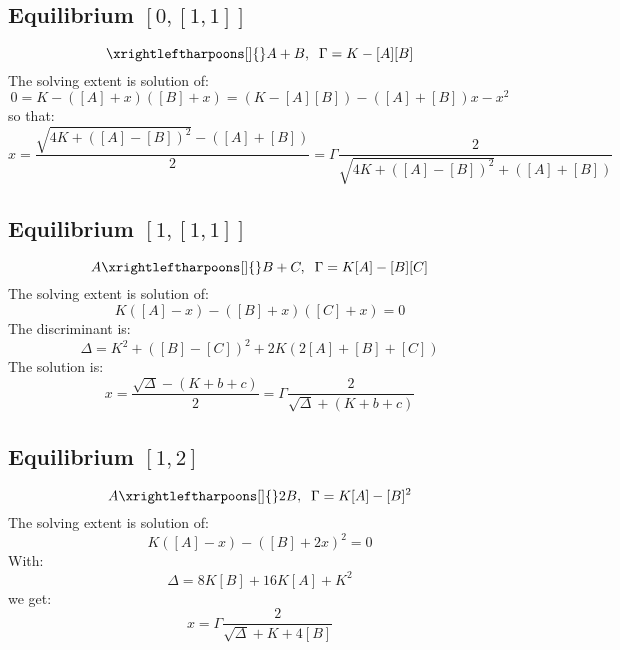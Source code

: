 \documentclass[aps,12pt]{revtex4}
\begin{document}
\subsection{Equilibrium $[0,[1,1]]$}
\begin{equation}
	\xrightleftharpoons[]{} A+B, \;\; \Gamma = K - [A][B]
\end{equation}
The solving extent is solution of:
\begin{equation}
	0 = K - ([A]+x)([B]+x) = (K - [A][B]) - ([A]+[B]) x - x^2
\end{equation}
so that:
\begin{equation}
	x = \dfrac{\sqrt{4K+([A]-[B])^2} - ([A]+[B])}{2} = \Gamma \dfrac{2}{\sqrt{4K+([A]-[B])^2} + ([A]+[B])}
\end{equation}

\subsection{Equilibrium $[1,[1,1]]$}
\begin{equation}
	A \xrightleftharpoons[]{} B+C, \;\; \Gamma = K[A] - [B][C]
\end{equation}
The solving extent is solution of:
\begin{equation}
	K([A]-x) - ([B]+x)([C]+x)= 0
\end{equation}
The discriminant is:
\begin{equation}
	\Delta = K^2 + ([B]-[C])^2 + 2K(2[A]+[B]+[C])
\end{equation}
The solution is:
\begin{equation}
	x = \dfrac{\sqrt{\Delta}-(K+b+c)}{2} = \Gamma \dfrac{2}{\sqrt{\Delta}+(K+b+c)}
\end{equation}

\subsection{Equilibrium $[1,2]$}
\begin{equation}
	A \xrightleftharpoons[]{} 2B, \;\; \Gamma = K[A] - [B]^2
\end{equation}
The solving extent is solution of:
\begin{equation}
 K([A]-x) - ([B]+2x)^2 = 0
\end{equation}
With:
\begin{equation}
\Delta = 8K[B]+16K[A]+K^2
\end{equation}
we get:
\begin{equation}
	x = \Gamma \dfrac{2}{\sqrt{\Delta} + K+4[B]}
\end{equation}
\end{document}
